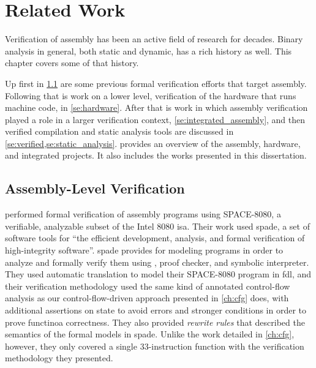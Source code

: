 \chapter{Related Work}\label{ch:related}

Verification of assembly has been an active field of research for decades.
Binary analysis in general, both static and dynamic, has a rich history as well.
This chapter covers some of that history.

Up first in \cref{se:previous_assembly}
are some previous formal verification efforts that target assembly.
Following that is work on a lower level,
verification of the hardware that runs machine code, in \cref{se:hardware}.
After that is work in which assembly verification played a role
in a larger verification context, \cref{se:integrated_assembly},
and then verified compilation and static analysis tools are discussed
in \cref{se:verified,se:static_analysis}.
 provides an overview of the assembly,
hardware, and integrated projects.
It also includes the works presented in this dissertation.


\section{Assembly-Level Verification}\label{se:previous_assembly}
\textcite{clutterbuck1988verification} performed formal verification
of assembly programs using SPACE-8080, a verifiable,
analyzable subset of the Intel 8080 \ac{isa}.
Their work used \ac{spade}, a set of software tools for ``the efficient development,
analysis, and formal verification of high-integrity software''.
\Ac{spade} provides  for modeling programs
in order to analyze and formally verify them
using , proof checker, and symbolic interpreter.
They used automatic translation to model their SPACE-8080 program
in \ac{fdl}, and their verification methodology used the same kind of
annotated control-flow analysis as our control-flow-driven approach
presented in \cref{ch:cfg} does, with additional assertions on state to avoid errors
and stronger conditions in order to prove functinoa correctness.
They also provided \emph{rewrite rules} that described the semantics
of the formal models in \ac{spade}. Unlike the work detailed in \cref{ch:cfg}, however,
they only covered a single 33-instruction function
with the verification methodology they presented.

